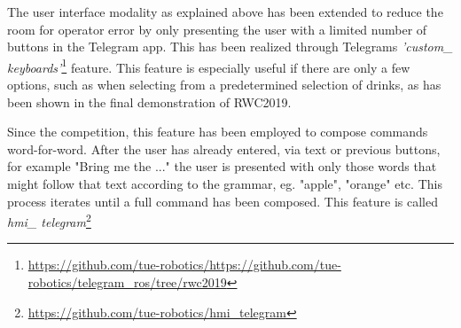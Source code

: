 \label{ssec:keyboard}
The user interface modality as explained above has been extended to reduce the room for operator error by only presenting the user with a limited number of buttons in the Telegram app. This has been realized through Telegrams \emph{'custom\_ keyboards'}\footnote{\url{https://github.com/tue-robotics/https://github.com/tue-robotics/telegram_ros/tree/rwc2019}} feature. This feature is especially useful if there are only a few options, such as when selecting from a predetermined selection of drinks, as has been shown in the final demonstration of RWC2019.

Since the competition, this feature has been employed to compose commands word-for-word. After the user has already entered, via text or previous buttons, for example "Bring me the ..." the user is presented with only those words that might follow that text according to the grammar, eg. "apple", "orange" etc. This process iterates until a full command has been composed. This feature is called \emph{hmi\_ telegram}\footnote{\url{https://github.com/tue-robotics/hmi_telegram}}